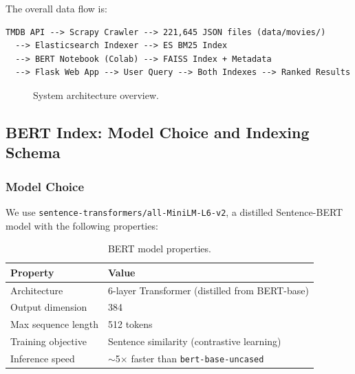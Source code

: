 \documentclass[11pt,a4paper]{article}
\begin{document}
\noindent The overall data flow is:

\begin{lstlisting}
TMDB API --> Scrapy Crawler --> 221,645 JSON files (data/movies/)
  --> Elasticsearch Indexer --> ES BM25 Index
  --> BERT Notebook (Colab) --> FAISS Index + Metadata
  --> Flask Web App --> User Query --> Both Indexes --> Ranked Results
\end{lstlisting}

\begin{figure}[H]
\centering
\caption{System architecture overview.}
\label{fig:architecture}
\end{figure}

\subsection{BERT Index: Model Choice and Indexing Schema}
\label{sec:bert}

\subsubsection{Model Choice}

We use \texttt{sentence-transformers/all-MiniLM-L6-v2}, a distilled Sentence-BERT model with the following properties:

\begin{table}[H]
\centering
\begin{tabular}{@{}ll@{}}
\toprule
\textbf{Property} & \textbf{Value} \\
\midrule
Architecture & 6-layer Transformer (distilled from BERT-base) \\
Output dimension & 384 \\
Max sequence length & 512 tokens \\
Training objective & Sentence similarity (contrastive learning) \\
Inference speed & $\sim$5$\times$ faster than \texttt{bert-base-uncased} \\
\bottomrule
\end{tabular}
\caption{BERT model properties.}
\end{table}
\end{document}
